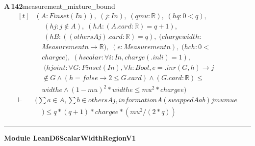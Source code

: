 \documentclass[conference]{IEEEtran}
\theoremstyle{definition}
\newcommand{\lean}[1]{\textsf{\footnotesize #1}}
\begin{document}
\noindent\textbf{A\,142}\quad\lean{measurement\_mixture\_bound}
{\footnotesize\[ \begin{aligned}[t]
&(\mathit{A} : \mathit{Finset} (\mathit{I} \mathit{n})),\; (\mathit{j} : \mathit{I} \mathit{n}),\; (\mathit{q} \mathit{mu} : \mathbb{R} ),\; (\mathit{hq} : 0<\mathit{q}),\\
&\quad \; (\mathit{hj} : \mathit{j} \notin \mathit{A}),\; (\mathit{hA} : (\mathit{A}.\mathit{card}:\mathbb{R} )=\mathit{q}+1),\\
&\quad \; (\mathit{hB} : ((\mathit{others} \mathit{A} \mathit{j}).\mathit{card}:\mathbb{R} )=\mathit{q}),\; (\mathit{charge} \mathit{width} :\\
&\quad \mathit{Measurement} \mathit{n} \to \mathbb{R} ),\; (\mathit{e} : \mathit{Measurement} \mathit{n}),\; (\mathit{hch} : 0 <\\
&\quad \mathit{charge} \mathit{e}),\; (\mathit{hscalar} : \forall \mathit{i} : \mathit{I} \mathit{n}, \mathit{charge} (.\mathit{inl} \mathit{i}) = 1),\\
&\quad \; (\mathit{hjoint} : \forall \mathit{G} : \mathit{Finset} (\mathit{I} \mathit{n}), \forall \mathit{h} : \mathit{Bool}, \mathit{e} = .\mathit{inr} (\mathit{G},\mathit{h}) \to \mathit{j}\\
&\quad \notin \mathit{G} \wedge (\mathit{h}=\mathit{false} \to 2 \leq \mathit{G}.\mathit{card}) \wedge (\mathit{G}.\mathit{card}:\mathbb{R} ) \leq\\
&\quad \mathit{width} \mathit{e} \wedge (1-\mathit{mu})^{2}*\mathit{width} \mathit{e} \leq \mathit{mu}^{2}*\mathit{charge} \mathit{e})\\
\vdash\;&(\textstyle\sum \mathit{a} \in \mathit{A}, \textstyle\sum \mathit{b} \in \mathit{others} \mathit{A} \mathit{j}, \mathit{information} \mathit{A} (\mathit{swapped} \mathit{A} \mathit{a} \mathit{b}) \mathit{j} \mathit{mu} \mathit{mu} \mathit{e}\\
&\quad ) \leq \mathit{q}*(\mathit{q}+1)*\mathit{charge} \mathit{e}*(\mathit{mu}^{2}/(2*\mathit{q}))
\end{aligned} \]}

\vspace{4pt}\noindent\rule{\columnwidth}{0.4pt}\par\vspace{2pt}
\noindent\textbf{Module \lean{LeanD6ScalarWidthRegionV1}}\par\vspace{3pt}
\end{document}
